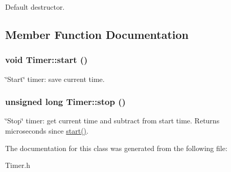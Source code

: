 Default destructor. 

\subsection{Member Function Documentation}
\hypertarget{classTimer_3a8b5272198d029779dc9302a54305a8}{
\subsubsection[{start}]{\setlength{\rightskip}{0pt plus 5cm}void Timer::start ()}}
\label{classTimer_3a8b5272198d029779dc9302a54305a8}


\char`\"{}Start\char`\"{} timer: save current time. \hypertarget{classTimer_6593c73e68343edf6ce2d1c14302c44a}{
\subsubsection[{stop}]{\setlength{\rightskip}{0pt plus 5cm}unsigned long Timer::stop ()}}
\label{classTimer_6593c73e68343edf6ce2d1c14302c44a}


\char`\"{}Stop\char`\"{} timer: get current time and subtract from start time. Returns microseconds since \hyperlink{classTimer_3a8b5272198d029779dc9302a54305a8}{start()}. 

The documentation for this class was generated from the following file:\begin{CompactItemize}
\item 
Timer.h\end{CompactItemize}
